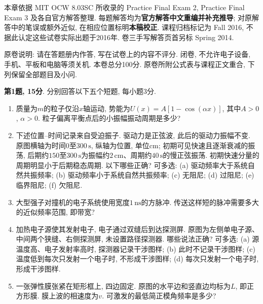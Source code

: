 本章依据 MIT OCW 8.03SC 所收录的 Practice Final Exam 2, Practice Final Exam 3 及各自官方解答整理. 每题解答均为\textbf{官方解答中文重编并补充推导}; 对原解答中的笔误或额外近似, 在相应位置标明\textbf{本稿校正}. 课程归档标记为 Fall 2016, 不据此认定这些试卷实际出题于2016年. 卷三手写解答页首另标 Spring 2014.

原卷说明: 请在答题册内作答, 写在试卷上的内容不评分. 闭卷, 不允许电子设备, 手机、平板和电脑等须关机. 本卷总分100分. 原卷所附公式表与课程正文重合, 下列保留全部题目及小问.

\begin{exercise}
\textbf{第1题, 15分}. \label{exam:f2.1}
分别回答以下五个短题, 每小题3分.
\begin{enumerate}[label=1.\arabic*.]
\item 质量为$m$的粒子仅沿$x$轴运动, 势能为$U(x)=A[1-\cos(\alpha x)]$, 其中$A>0$, $\alpha>0$. 粒子偏离平衡点后的小振幅振动周期是多少?
\item 下述位置--时间记录来自受迫振子. 驱动力是正弦波, 此后的驱动力振幅不变. 原图横轴为时间$0$至$300\,\mathrm{s}$, 纵轴为位置, 单位$\mathrm{cm}$; 初期可见快速且逐渐衰减的振荡, 后期约$150$至$300\,\mathrm{s}$为振幅约$2\,\mathrm{cm}$、周期约$40\,\mathrm{s}$的慢正弦振荡. 初期快速分量的周期明显小于后期稳态周期. 以下哪些正确? 可多选: (a) 驱动频率大于系统自然共振频率; (b) 驱动频率小于系统自然共振频率; (c) 无阻尼; (d) 过阻尼; (e) 临界阻尼; (f) 欠阻尼.
\item 大型强子对撞机的电子系统使用宽度$1\,\mathrm{ns}$的方脉冲. 传送这样短的脉冲需要多大的近似频率范围, 即带宽?
\item 加热电子源使其发射电子, 电子通过双缝后到达探测屏. 原图为左侧单电子源、中间两个狭缝、右侧探测屏, 未设置路径探测器. 哪些说法正确? 可多选: (a) 源温度高、电子发射率高时, 探测器记录干涉图样; (b) 此时不记录干涉图样; (c) 温度低到每次只发射一个电子时, 不形成干涉图样; (d) 每次只发射一个电子时, 形成干涉图样.
\item 一张弹性膜张紧在矩形框上, 四边固定. 原图的水平边和竖直边均标为$L$, 即正方形膜. 膜上波的相速度为$v$. 可激发的最低简正模角频率是多少?
\end{enumerate}
\end{exercise}
